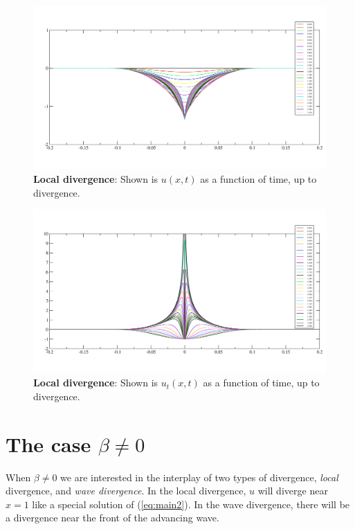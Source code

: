 \documentclass[12pt,a4paper]{article}
\def\eref#1{(\ref{#1})}
\numberwithin{equation}{section}
\theoremstyle{definition} %
\begin{document}
  \begin{figure}[h!]
  \includegraphics[width=1\textwidth]{uforfig.jpg}
  \caption{{\bf{Local divergence}}: Shown is $u(x,t)$ as a function of
    time, up to divergence.
  }\label{fig:u}
\end{figure}
\begin{figure}[h!]
  \includegraphics[width=1\textwidth]{utforfig.jpg}
  \caption{{\bf{Local divergence}}: Shown is $u_t(x,t)$ as a function of
    time, up to divergence.
  }\label{fig:ut}
\end{figure}


\newpage


\section{The case $\beta\ne0$}
When $\beta \ne0$ we are interested in the interplay of two types of
divergence, \emph{local} divergence, and \emph{wave divergence}.
In the local divergence, $u$ will diverge near $x=1$ like a special solution of
\eref{eq:main2}. In the wave divergence, there will be a divergence
near the front of the advancing wave.
\end{document}
